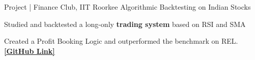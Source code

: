 \begin{cventries}
\cventry
{Project | Finance Club, IIT Roorkee} %
{Algorithmic Backtesting on Indian Stocks} %
{} %
{} %
{
	\begin{cvitems} %
		\item {Studied and backtested a long-only \textbf{trading system} based on RSI and SMA}
		\item {Created a Profit Booking Logic and outperformed the benchmark on REL. {\href{https://github.com/ChanBong/finance_projects}{\bf [GitHub Link]}}}
	\end{cvitems}
}
    




\end{cventries}